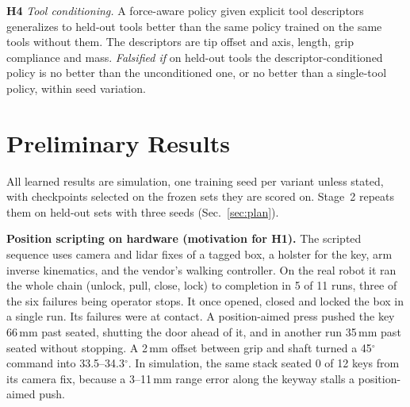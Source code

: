 \documentclass[conference]{IEEEtran}
\newcommand{\hyp}[1]{\textbf{H#1}}
\begin{document}
\hyp{4} \emph{Tool conditioning.} A force-aware policy given explicit tool descriptors generalizes to held-out tools
better than the same policy trained on the same tools without them. The descriptors are tip offset and axis, length, grip
compliance and mass. \emph{Falsified if} on held-out tools the descriptor-conditioned policy is no better than the
unconditioned one, or no better than a single-tool policy, within seed variation.

\section{Preliminary Results}
\label{sec:results}

All learned results are simulation, one training seed per variant unless stated, with checkpoints selected on the frozen
sets they are scored on. Stage~2 repeats them on held-out sets with three seeds (Sec.~\ref{sec:plan}).

\textbf{Position scripting on hardware (motivation for \hyp{1}).} The scripted sequence uses camera and lidar fixes of a
tagged box, a holster for the key, arm inverse kinematics, and the vendor's walking controller. On the real robot it ran
the whole chain (unlock, pull, close, lock) to completion in 5 of 11 runs, three of the six failures being operator stops.
It once opened, closed and locked the box in a single run. Its failures were at contact. A position-aimed press pushed
the key 66\,mm past seated, shutting the door ahead of it, and in another run 35\,mm past seated without stopping. A
2\,mm offset between grip and shaft turned a 45$^\circ$ command into 33.5--34.3$^\circ$. In simulation, the same stack
seated 0 of 12 keys from its camera fix, because a 3--11\,mm range error along the keyway stalls a position-aimed push.
\end{document}
